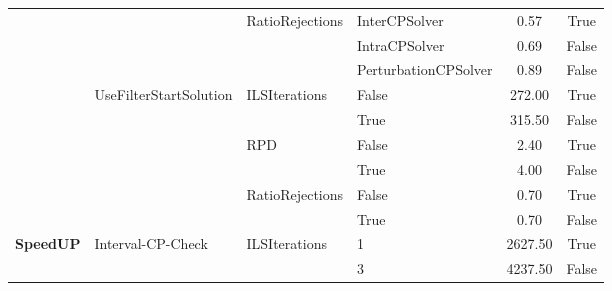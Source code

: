 \begin{table}[!ht]
\begin{tabular}{@{}l l l l c c @{}}
		                                      &                                              & \multirow[t]{3}{*}{RatioRejections} & InterCPSolver        & 0.57            & True            \\\cmidrule(lr){4-6}
		                                      &                                              &                                     & IntraCPSolver        & 0.69            & False           \\\cmidrule(lr){4-6}
		                                      &                                              &                                     & PerturbationCPSolver & 0.89            & False           \\\cmidrule(lr){2-6}
		                                      & \multirow[t]{6}{*}{UseFilterStartSolution}   & \multirow[t]{2}{*}{ILSIterations}   & False                & 272.00          & True            \\\cmidrule(lr){4-6}
		                                      &                                              &                                     & True                 & 315.50          & False           \\\cmidrule(lr){3-6}
		                                      &                                              & \multirow[t]{2}{*}{RPD}             & False                & 2.40            & True            \\\cmidrule(lr){4-6}
		                                      &                                              &                                     & True                 & 4.00            & False           \\\cmidrule(lr){3-6}
		                                      &                                              & \multirow[t]{2}{*}{RatioRejections} & False                & 0.70            & True            \\\cmidrule(lr){4-6}
		                                      &                                              &                                     & True                 & 0.70            & False           \\\midrule
		\multirow[t]{15}{*}{\textbf{SpeedUP}} & \multirow[t]{9}{*}{Interval-CP-Check}        & \multirow[t]{3}{*}{ILSIterations}   & 1                    & 2627.50         & True            \\\cmidrule(lr){4-6}
		                                      &                                              &                                     & 3                    & 4237.50         & False           \\\cmidrule(lr){4-6}

\end{tabular}
\end{table}

